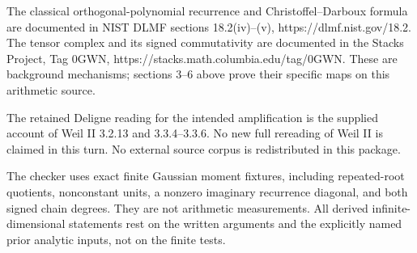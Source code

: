 The classical orthogonal-polynomial recurrence and Christoffel--Darboux
formula are documented in NIST DLMF sections 18.2(iv)--(v),
https://dlmf.nist.gov/18.2. The tensor complex and its signed
commutativity are documented in the Stacks Project, Tag 0GWN,
https://stacks.math.columbia.edu/tag/0GWN. These are background
mechanisms; sections 3--6 above prove their specific maps on this
arithmetic source.

The retained Deligne reading for the intended amplification is the
supplied account of Weil II 3.2.13 and 3.3.4--3.3.6. No new full
rereading of Weil II is claimed in this turn. No external source corpus
is redistributed in this package.

The checker uses exact finite Gaussian moment fixtures, including
repeated-root quotients, nonconstant units, a nonzero imaginary
recurrence diagonal, and both signed chain degrees. They are not
arithmetic measurements. All derived infinite-dimensional statements
rest on the written arguments and the explicitly named prior analytic
inputs, not on the finite tests.

